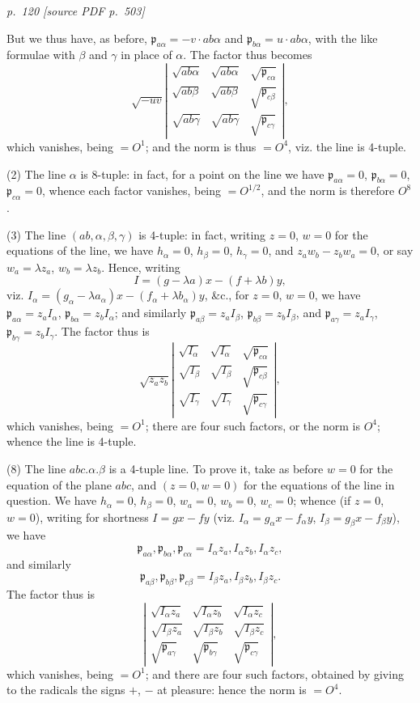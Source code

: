 \documentclass[11pt,a4paper]{article}
\newcommand{\sourcepage}[2]{%
  \bigskip
  \noindent\textit{p.~#1 [source PDF p.~#2]}%
  \par\smallskip
}
\newcommand{\p}{\mathfrak p}
\newcommand{\surf}[1]{\par\smallskip\noindent{\itshape \{Surface $#1$.\}}\par\smallskip}
\begin{document}
\sourcepage{120}{503}
But we thus have, as before,
$\p_{a\alpha}=-v\cdot ab\alpha$ and $\p_{b\alpha}=u\cdot ab\alpha$, with the like
formulae with $\beta$ and $\gamma$ in place of $\alpha$. The factor thus becomes
\[
\sqrt{-uv}\left|
\begin{array}{ccc}
\sqrt{ab\alpha}&\sqrt{ab\alpha}&\sqrt{\p_{c\alpha}}\\
\sqrt{ab\beta}&\sqrt{ab\beta}&\sqrt{\p_{c\beta}}\\
\sqrt{ab\gamma}&\sqrt{ab\gamma}&\sqrt{\p_{c\gamma}}
\end{array}\right|,
\]
which vanishes, being $=O^1$; and the norm is thus $=O^4$, viz. the line is
4-tuple.

(2) The line $\alpha$ is 8-tuple: in fact, for a point on the line we have
$\p_{a\alpha}=0$, $\p_{b\alpha}=0$, $\p_{c\alpha}=0$, whence each factor vanishes,
being $=O^{1/2}$, and the norm is therefore $O^8$.

(3) The line $(ab,\alpha,\beta,\gamma)$ is 4-tuple: in fact, writing $z=0$, $w=0$
for the equations of the line, we have $h_\alpha=0$, $h_\beta=0$, $h_\gamma=0$,
and $z_aw_b-z_bw_a=0$, or say $w_a=\lambda z_a$, $w_b=\lambda z_b$. Hence, writing
\[
I=(g-\lambda a)x-(f+\lambda b)y,
\]
viz. $I_\alpha=(g_\alpha-\lambda a_\alpha)x-(f_\alpha+\lambda b_\alpha)y$,
\&c., for $z=0$, $w=0$, we have
$\p_{a\alpha}=z_aI_\alpha$, $\p_{b\alpha}=z_bI_\alpha$; and similarly
$\p_{a\beta}=z_aI_\beta$, $\p_{b\beta}=z_bI_\beta$, and
$\p_{a\gamma}=z_aI_\gamma$, $\p_{b\gamma}=z_bI_\gamma$. The factor thus is
\[
\sqrt{z_az_b}\left|
\begin{array}{ccc}
\sqrt{I_\alpha}&\sqrt{I_\alpha}&\sqrt{\p_{c\alpha}}\\
\sqrt{I_\beta}&\sqrt{I_\beta}&\sqrt{\p_{c\beta}}\\
\sqrt{I_\gamma}&\sqrt{I_\gamma}&\sqrt{\p_{c\gamma}}
\end{array}\right|,
\]
which vanishes, being $=O^1$; there are four such factors, or the norm is $O^4$;
whence the line is 4-tuple.

(8) The line $abc.\alpha.\beta$ is a 4-tuple line. To prove it, take as before
$w=0$ for the equation of the plane $abc$, and $(z=0,w=0)$ for the equations of
the line in question. We have $h_\alpha=0$, $h_\beta=0$, $w_a=0$, $w_b=0$,
$w_c=0$; whence (if $z=0$, $w=0$), writing for shortness $I=gx-fy$
(viz. $I_\alpha=g_\alpha x-f_\alpha y$, $I_\beta=g_\beta x-f_\beta y$), we have
\[
\p_{a\alpha},\p_{b\alpha},\p_{c\alpha}=I_\alpha z_a,I_\alpha z_b,I_\alpha z_c,
\]
and similarly
\[
\p_{a\beta},\p_{b\beta},\p_{c\beta}=I_\beta z_a,I_\beta z_b,I_\beta z_c.
\]
The factor thus is
\[
\left|
\begin{array}{ccc}
\sqrt{I_\alpha z_a}&\sqrt{I_\alpha z_b}&\sqrt{I_\alpha z_c}\\
\sqrt{I_\beta z_a}&\sqrt{I_\beta z_b}&\sqrt{I_\beta z_c}\\
\sqrt{\p_{a\gamma}}&\sqrt{\p_{b\gamma}}&\sqrt{\p_{c\gamma}}
\end{array}\right|,
\]
which vanishes, being $=O^1$; and there are four such factors, obtained by giving
to the radicals the signs $+$, $-$ at pleasure: hence the norm is $=O^4$.
\surf{abc\alpha\beta\gamma}
\end{document}
